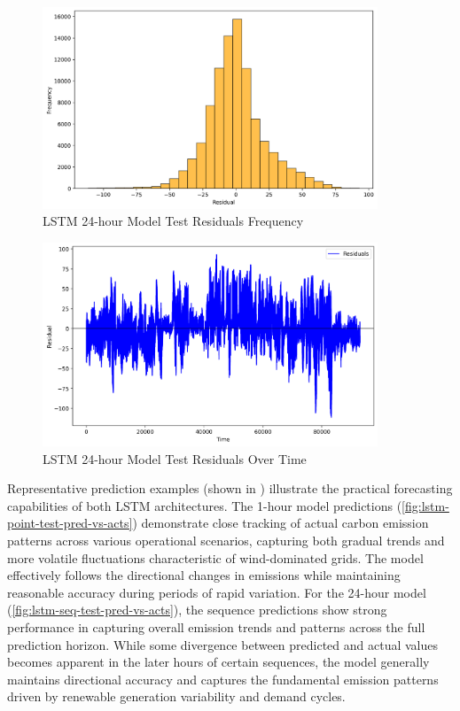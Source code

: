 \begin{figure}[ht]
  \centering
  \includegraphics[width=10cm]{sections/figures/lstm_seq_test_residuals_frequency.png}
  \caption{LSTM 24-hour Model Test Residuals Frequency}
  \label{fig:lstm-seq-test-residuals-frequency}
\end{figure}

\begin{figure}[ht]
  \centering
  \includegraphics[width=10cm]{sections/figures/lstm_seq_test_residuals_over_time.png}
  \caption{LSTM 24-hour Model Test Residuals Over Time}
  \label{fig:lstm-seq-test-residuals-over-time}
\end{figure}

Representative prediction examples (shown in ) illustrate the practical forecasting capabilities of both LSTM architectures. The 1-hour model predictions (\autoref{fig:lstm-point-test-pred-vs-acts}) demonstrate close tracking of actual carbon emission patterns across various operational scenarios, capturing both gradual trends and more volatile fluctuations characteristic of wind-dominated grids. The model effectively follows the directional changes in emissions while maintaining reasonable accuracy during periods of rapid variation. For the 24-hour model (\autoref{fig:lstm-seq-test-pred-vs-acts}), the sequence predictions show strong performance in capturing overall emission trends and patterns across the full prediction horizon. While some divergence between predicted and actual values becomes apparent in the later hours of certain sequences, the model generally maintains directional accuracy and captures the fundamental emission patterns driven by renewable generation variability and demand cycles.

